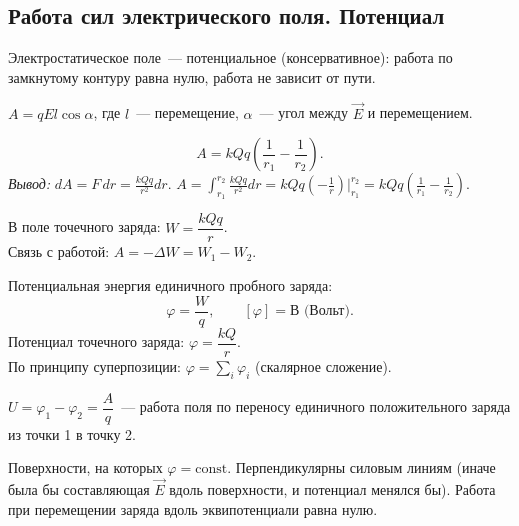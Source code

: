 \documentclass[12pt]{article}
\begin{document}
\subsection{Работа сил электрического поля. Потенциал}

Электростатическое поле~--- потенциальное (консервативное): работа по замкнутому контуру равна нулю, работа не зависит от пути.

\begin{definition}
	$A = qEl\cos\alpha$, где $l$~--- перемещение, $\alpha$~--- угол между $\vec{E}$ и перемещением.
\end{definition}

\begin{definition}
	\[
		A = kQq\left(\frac{1}{r_1} - \frac{1}{r_2}\right).
	\]
	\textit{Вывод:} $dA = F\,dr = \frac{kQq}{r^2}dr$. $A = \int_{r_1}^{r_2}\frac{kQq}{r^2}dr = kQq\left(-\frac{1}{r}\right)\Big|_{r_1}^{r_2} = kQq\left(\frac{1}{r_1}-\frac{1}{r_2}\right)$.
\end{definition}

\begin{definition}
	В поле точечного заряда: $W = \dfrac{kQq}{r}$.\\
	Связь с работой: $A = -\Delta W = W_1 - W_2$.
\end{definition}

\begin{definition}[Потенциал]
	Потенциальная энергия единичного пробного заряда:
	\[
		\varphi = \frac{W}{q}, \qquad [\varphi] = \text{В (Вольт)}.
	\]
	Потенциал точечного заряда: $\varphi = \dfrac{kQ}{r}$.\\
	По принципу суперпозиции: $\varphi = \sum_i \varphi_i$ (скалярное сложение).
\end{definition}

\begin{definition}
	$U = \varphi_1 - \varphi_2 = \dfrac{A}{q}$~--- работа поля по переносу единичного положительного заряда из точки 1 в точку 2.
\end{definition}

\begin{definition}
	Поверхности, на которых $\varphi = \text{const}$. Перпендикулярны силовым линиям (иначе была бы составляющая $\vec{E}$ вдоль поверхности, и потенциал менялся бы). Работа при перемещении заряда вдоль эквипотенциали равна нулю.
\end{definition}
\end{document}
